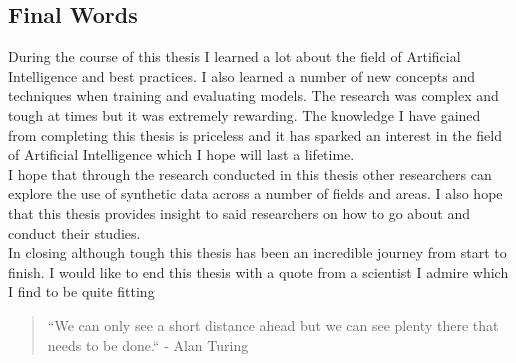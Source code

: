 \subsection{Final Words}
During the course of this thesis I learned a lot about the field of Artificial Intelligence and best practices.  I also learned a number of new concepts and techniques when training and evaluating models.  The research was complex and tough at times but it was extremely rewarding.  The knowledge I have gained from completing this thesis is priceless and it has sparked an interest in the field of Artificial Intelligence which I hope will last a lifetime. 
\\
I hope that through the research conducted in this thesis other researchers can explore the use of synthetic data across a number of fields and areas.  I also hope that this thesis provides insight to said researchers on how to go about and conduct their studies.
\\
In closing although tough this thesis has been an incredible journey from start to finish.  I would like to end this thesis with a quote from a scientist I admire which I find to be quite fitting \begin{quote}``We can only see a short distance ahead but we can see plenty there that needs to be done.`` - Alan Turing\end{quote}